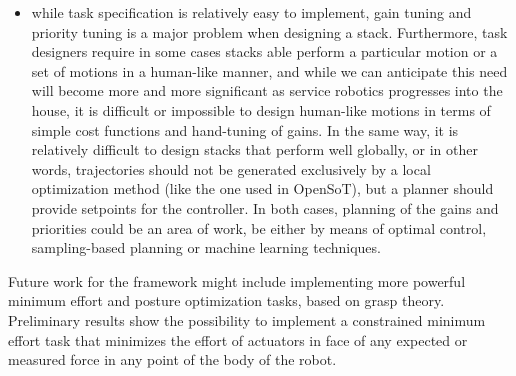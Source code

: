 \documentclass[%
	paper=A4,					%
	twoside=true,				%
	openright,			.
	parskip=full,				%
	chapterprefix=true,			%
	11pt,						%
	headings=normal,			%
	bibliography=totoc,			%
	listof=totoc,				%
	titlepage=on,				%
	captions=tableabove,		%
	draft=false,				%
]{scrreprt}%
\begin{document}
\begin{itemize}
 \item while task specification is relatively easy to implement, gain tuning and priority tuning is a major problem when designing a stack. Furthermore, task designers require in some cases stacks able perform a particular motion or a set of motions in a human-like manner, and while we can anticipate this need will become more and more significant as service robotics progresses into the house, it is difficult or impossible to design human-like motions in terms of simple cost functions and hand-tuning of gains. In the same way, it is relatively difficult to design stacks that perform well globally, or in other words, trajectories should not be generated exclusively by a local optimization method (like the one used in OpenSoT), but a planner should provide setpoints for the controller. In both cases, planning of the gains and priorities could be an area of work, be either by means of optimal control, sampling-based planning or machine learning techniques.
\end{itemize}
Future work for the framework might include implementing more powerful minimum effort and posture optimization tasks, based on grasp theory. Preliminary results show the possibility to implement a constrained minimum effort task that minimizes the effort of actuators in face of any expected or measured force in any point of the body of the robot.
\cleardoublepage

{%
\renewcommand{\bibfont}{\normalfont\small}
\setlength{\biblabelsep}{0pt}
\setlength{\bibitemsep}{0.5\baselineskip plus 0.5\baselineskip}
\printbibliography[nottype=online]
\printbibliography[heading=subbibliography,title={Websites},type=online,prefixnumbers={@}]
}
\cleardoublepage



%

%

\end{document}
